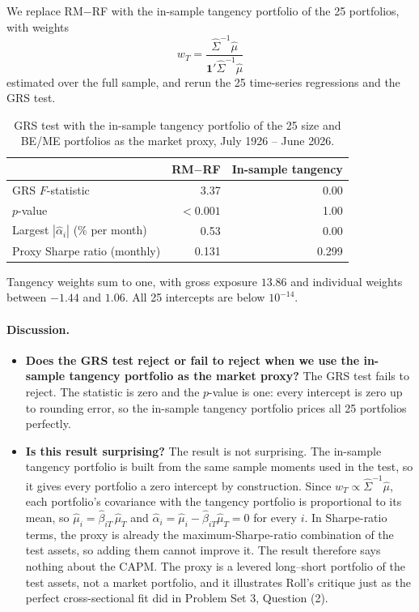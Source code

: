 We replace RM$-$RF with the in-sample tangency portfolio of the 25
portfolios, with weights
\[
w_T = \frac{\hat\Sigma^{-1}\hat\mu}{\mathbf{1}'\hat\Sigma^{-1}\hat\mu}
\]
estimated over the full sample, and rerun the 25 time-series regressions and
the GRS test.

\begin{table}[H]
\centering
\caption{GRS test with the in-sample tangency portfolio of the 25 size and
BE/ME portfolios as the market proxy, July 1926 -- June 2026.}
\small
\begin{tabular}{lrr}
\toprule
& RM$-$RF & In-sample tangency \\
\midrule
GRS $F$-statistic & 3.37 & 0.00 \\
$p$-value & $<0.001$ & 1.00 \\
Largest $|\hat\alpha_i|$ (\% per month) & 0.53 & 0.00 \\
Proxy Sharpe ratio (monthly) & 0.131 & 0.299 \\
\bottomrule
\end{tabular}
\label{tab:p3g}
\vspace{2pt}\begin{minipage}{0.93\textwidth}\footnotesize
Tangency weights sum to one, with gross exposure $13.86$ and individual
weights between $-1.44$ and $1.06$. All 25 intercepts are below $10^{-14}$.
\end{minipage}
\end{table}

\paragraph{Discussion.}
\begin{itemize}
\setlength{\itemsep}{4pt}\setlength{\parskip}{0pt}

\item \textbf{Does the GRS test reject or fail to reject when we use the
in-sample tangency portfolio as the market proxy?} The GRS test fails to
reject. The statistic is zero and the
$p$-value is one: every intercept is zero up to rounding error, so the
in-sample tangency portfolio prices all 25 portfolios perfectly.

\item \textbf{Is this result surprising?} The result is not surprising.
The in-sample tangency portfolio is built from the same sample moments used
in the test, so it gives every portfolio a zero intercept by construction.
Since $w_T \propto \hat\Sigma^{-1}\hat\mu$, each portfolio's covariance with
the tangency portfolio is proportional to its mean, so
$\hat\mu_i = \hat\beta_{iT}\,\hat\mu_T$ and
$\hat\alpha_i = \hat\mu_i - \hat\beta_{iT}\hat\mu_T = 0$ for every $i$. In Sharpe-ratio terms, the proxy is already the
maximum-Sharpe-ratio combination of the test assets, so adding them cannot
improve it. The result therefore says nothing about the CAPM. The proxy is a
levered long--short portfolio of the test assets, not a market portfolio,
and it illustrates Roll's critique just as the perfect cross-sectional fit
did in Problem Set 3, Question (2).

\end{itemize}


